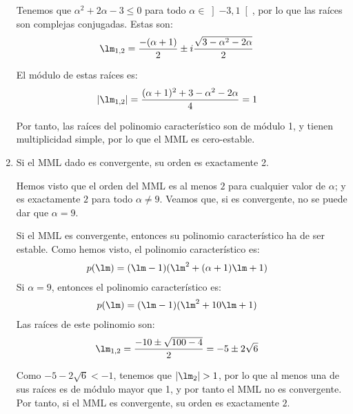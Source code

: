 \begin{ejercicio}
\begin{enumerate}
        Tenemos que $\alpha^2 + 2\alpha - 3\leq 0$ para todo $\alpha\in \left]-3,1\right[$, por lo que las raíces son complejas conjugadas. Estas son:
        \begin{align*}
            \lm_{1,2} &= \dfrac{-(\alpha + 1)}{2} \pm i \dfrac{\sqrt{3 - \alpha^2 - 2\alpha}}{2}
        \end{align*}

        El módulo de estas raíces es:
        \begin{align*}
            |\lm_{1,2}| &= \dfrac{(\alpha+1)^2 + 3-\alpha^2-2\alpha}{4}=1
        \end{align*}

        Por tanto, las raíces del polinomio característico son de módulo 1, y tienen multiplicidad simple, por lo que el MML es cero-estable.

        \item Si el MML dado es convergente, su orden es exactamente 2.
        
        Hemos visto que el orden del MML es al menos $2$ para cualquier valor de $\alpha$; y es exactamente $2$ para todo $\alpha\neq 9$. Veamos que, si es convergente, no se puede dar que $\alpha = 9$.

        Si el MML es convergente, entonces su polinomio característico ha de ser estable. Como hemos visto, el polinomio característico es:
        \begin{align*}
            p(\lm) &= (\lm - 1)(\lm^2 + (\alpha + 1)\lm + 1)
        \end{align*}
        Si $\alpha = 9$, entonces el polinomio característico es:
        \begin{align*}
            p(\lm) &= (\lm - 1)(\lm^2 + 10\lm + 1)
        \end{align*}
        Las raíces de este polinomio son:
        \begin{align*}
            \lm_{1,2} &= \dfrac{-10 \pm \sqrt{100 - 4}}{2} = -5 \pm 2\sqrt{6}
        \end{align*}

        Como $-5 -2\sqrt{6} < -1$, tenemos que $|\lm_2| > 1$, por lo que al menos una de sus raíces es de módulo mayor que 1, y por tanto el MML no es convergente. Por tanto, si el MML es convergente, su orden es exactamente $2$.
    \end{enumerate}
\end{ejercicio}

